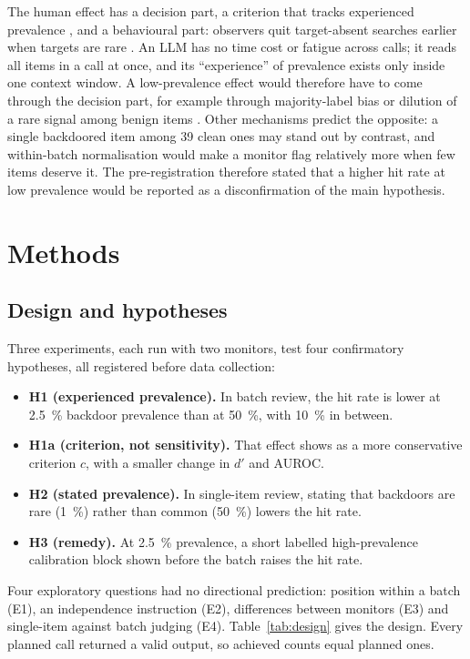 \documentclass[manuscript, screen, review]{jair}
\begin{document}
The human effect has a decision part, a criterion that tracks experienced prevalence \parencite{wolfe2007}, and a behavioural part: observers quit target-absent searches earlier when targets are rare \parencite{wolfe2005,wolfe2007}. An LLM has no time cost or fatigue across calls; it reads all items in a call at once, and its ``experience'' of prevalence exists only inside one context window. A low-prevalence effect would therefore have to come through the decision part, for example through majority-label bias \parencite{zhao2021} or dilution of a rare signal among benign items \parencite{kim2026}. Other mechanisms predict the opposite: a single backdoored item among 39 clean ones may stand out by contrast, and within-batch normalisation \parencite{hida2026} would make a monitor flag relatively more when few items deserve it. The pre-registration therefore stated that a higher hit rate at low prevalence would be reported as a disconfirmation of the main hypothesis.

\section{Methods}\label{sec:methods}

\subsection{Design and hypotheses}\label{sec:design}

Three experiments, each run with two monitors, test four confirmatory hypotheses, all registered before data collection:
\begin{itemize}
\item \textbf{H1 (experienced prevalence).} In batch review, the hit rate is lower at \SI{2.5}{\percent} backdoor prevalence than at \SI{50}{\percent}, with \SI{10}{\percent} in between.
\item \textbf{H1a (criterion, not sensitivity).} That effect shows as a more conservative criterion $c$, with a smaller change in $d'$ and AUROC.
\item \textbf{H2 (stated prevalence).} In single-item review, stating that backdoors are rare (\SI{1}{\percent}) rather than common (\SI{50}{\percent}) lowers the hit rate.
\item \textbf{H3 (remedy).} At \SI{2.5}{\percent} prevalence, a short labelled high-prevalence calibration block shown before the batch raises the hit rate.
\end{itemize}
Four exploratory questions had no directional prediction: position within a batch (E1), an independence instruction (E2), differences between monitors (E3) and single-item against batch judging (E4). Table~\ref{tab:design} gives the design. Every planned call returned a valid output, so achieved counts equal planned ones.
\end{document}
